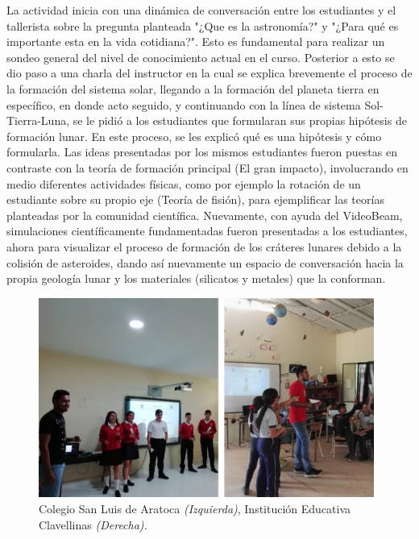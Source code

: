 \documentclass[a4paper,10pt]{article}
\begin{document}
\noindent La actividad inicia con una dinámica de conversación entre los estudiantes y el tallerista sobre la pregunta planteada "¿Que es la astronomía?" y "¿Para qué es importante esta en la vida cotidiana?". Esto es fundamental para realizar un sondeo general del nivel de conocimiento actual en el curso. Posterior a esto se dio paso a una charla del instructor en la cual se explica brevemente el proceso de la formación del sistema solar, llegando a la formación del planeta tierra en específico, en donde acto seguido, y continuando con la línea de sistema Sol-Tierra-Luna, se le pidió a los estudiantes que formularan sus propias hipótesis de formación lunar. En este proceso, se les explicó qué es una hipótesis y cómo formularla. Las ideas presentadas por los mismos estudiantes fueron puestas en contraste con la teoría de formación principal (El gran impacto), involucrando en medio diferentes actividades físicas, como por ejemplo la rotación de un estudiante sobre su propio eje (Teoría de fisión), para ejemplificar las teorías planteadas por la comunidad científica. Nuevamente, con ayuda del VideoBeam, simulaciones científicamente fundamentadas fueron presentadas a los estudiantes, ahora para visualizar el proceso de formación de los cráteres lunares debido a la colisión de asteroides, dando así nuevamente un espacio de conversación hacia la propia geología lunar y los materiales (silicatos y metales) que la conforman.\\


\begin{figure}[H]
    \centering
    \includegraphics[width=11cm]{J-S/luna.png}
    \caption{Colegio San Luis de Aratoca \textit{(Izquierda)}, Institución Educativa Clavellinas \textit{(Derecha).}}
    \label{fig: Luna}
\end{figure}
\end{document}
